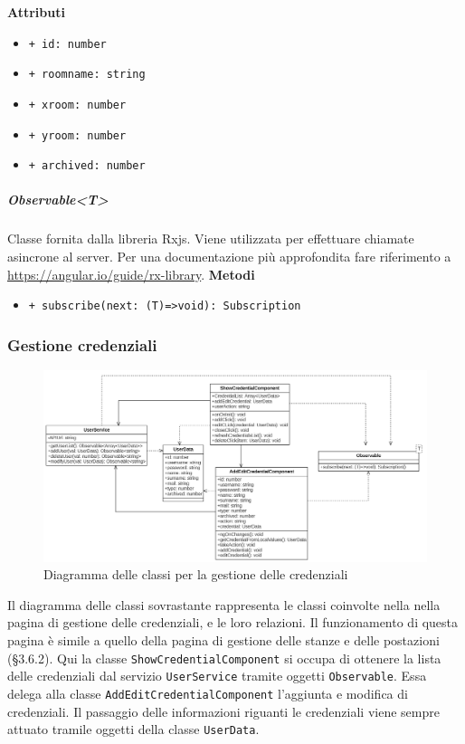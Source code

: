 \textbf{Attributi}
\begin{itemize}
	\item \texttt{+ id: number 	}
	\item \texttt{+ roomname: string 	}
	\item \texttt{+ xroom: number 	}
	\item \texttt{+ yroom: number 	}
	\item \texttt{+ archived: number}
\end{itemize}
\subparagraph{Observable<T>}
Classe fornita dalla libreria Rxjs. Viene utilizzata per effettuare chiamate asincrone al server. Per una documentazione più approfondita fare riferimento a \url{https://angular.io/guide/rx-library}. \newline
\textbf{Metodi}
\begin{itemize}
	\item \texttt{+ subscribe(next: (T)=>void): Subscription}
\end{itemize}

\subsubsection{Gestione credenziali}
\begin{figure}[H]
	\centering
	\includegraphics[width=18cm]{res/images/webapp-credenziali-diagrammaClassi.png}
	\caption{Diagramma delle classi per la gestione delle credenziali}
	\label{fig:DiagrammaClassiCredenziali}
\end{figure}
Il diagramma delle classi sovrastante rappresenta le classi coinvolte nella nella pagina di gestione delle credenziali, e le loro relazioni. Il funzionamento di questa pagina è simile a quello della pagina di gestione delle stanze e delle postazioni (§3.6.2). Qui la classe \texttt{ShowCredentialComponent} si occupa di ottenere la lista delle credenziali dal servizio \texttt{UserService} tramite oggetti \texttt{Observable}. Essa delega alla classe \texttt{AddEditCredentialComponent} l'aggiunta e modifica di credenziali. Il passaggio delle informazioni riguanti le credenziali viene sempre attuato tramile oggetti della classe \texttt{UserData}.

